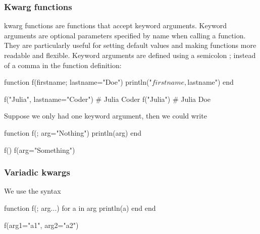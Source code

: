 \documentclass{report}
\begin{document}
    \bigbreak \noindent 
    \subsubsection{Kwarg functions}
    \bigbreak \noindent 
    kwarg functions are functions that accept keyword arguments. Keyword arguments are optional parameters specified by name when calling a function. They are particularly useful for setting default values and making functions more readable and flexible.
    \bigbreak \noindent 
    Keyword arguments are defined using a semicolon ; instead of a comma in the function definition:
    \bigbreak \noindent 
    \begin{jlcode}
function f(firstname; lastname="Doe")
    println("$firstname, $lastname")
end

f("Julia", lastname="Coder") # Julia Coder
f("Julia") # Julia Doe
    \end{jlcode}
    \bigbreak \noindent 
    Suppose we only had one keyword argument, then we could write
    \bigbreak \noindent 
    \begin{jlcode}
        function f(; arg="Nothing")
            println(arg)
        end

        f()
        f(arg="Something")
    \end{jlcode}

    \bigbreak \noindent 
    \subsubsection{Variadic kwargs}
    \bigbreak \noindent 
    We use the syntax
    \bigbreak \noindent 
    \begin{jlcode}
        function f(; arg...)
            for a in arg
                println(a)
            end
        end

        f(arg1="a1", arg2="a2")
    \end{jlcode}

    \pagebreak 
    \bigbreak \noindent 
\end{document}
